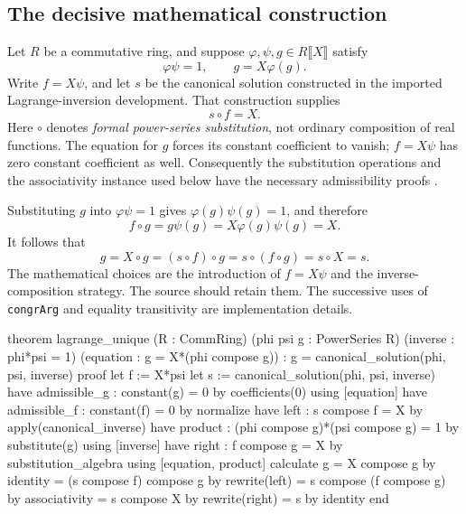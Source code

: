 \documentclass[11pt,a4paper]{article}
\newcommand{\codeid}[1]{\nolinkurl{#1}}
\begin{document}
\subsection{The decisive mathematical construction}

Let $R$ be a commutative ring, and suppose $\varphi,\psi,g\in R\llbracket X\rrbracket$ satisfy
\[
 \varphi\psi=1,\qquad g=X\varphi(g).
\]
Write $f=X\psi$, and let $s$ be the canonical solution constructed in the imported Lagrange-inversion development. That construction supplies
\[
 s\circ f=X.
\]
Here $\circ$ denotes \emph{formal power-series substitution}, not ordinary composition of real functions. The equation for $g$ forces its constant coefficient to vanish; $f=X\psi$ has zero constant coefficient as well. Consequently the substitution operations and the associativity instance used below have the necessary admissibility proofs \cite{srcseries}.

Substituting $g$ into $\varphi\psi=1$ gives $\varphi(g)\psi(g)=1$, and therefore
\[
 f\circ g=g\psi(g)=X\varphi(g)\psi(g)=X.
\]
It follows that
\begin{equation}
 g=X\circ g=(s\circ f)\circ g
   =s\circ(f\circ g)=s\circ X=s.
 \label{eq:series-chain}
\end{equation}
The mathematical choices are the introduction of $f=X\psi$ and the inverse-composition strategy. The source should retain them. The successive uses of \codeid{congrArg} and equality transitivity are implementation details.

\par\noindent\begin{minipage}{\linewidth}
\begin{rawcode}
theorem lagrange_unique
    (R : CommRing) (phi psi g : PowerSeries R)
    (inverse : phi*psi = 1) (equation : g = X*(phi compose g)) :
    g = canonical_solution(phi, psi, inverse)
proof
  let f := X*psi
  let s := canonical_solution(phi, psi, inverse)
  have admissible_g : constant(g) = 0
    by coefficients(0) using [equation]
  have admissible_f : constant(f) = 0 by normalize
  have left : s compose f = X by apply(canonical_inverse)
  have product : (phi compose g)*(psi compose g) = 1
    by substitute(g) using [inverse]
  have right : f compose g = X
    by substitution_algebra using [equation, product]
  calculate
    g = X compose g                         by identity
      = (s compose f) compose g             by rewrite(left)
      = s compose (f compose g)             by associativity
      = s compose X                         by rewrite(right)
      = s                                   by identity
end
\end{rawcode}
\end{minipage}\par
\end{document}
